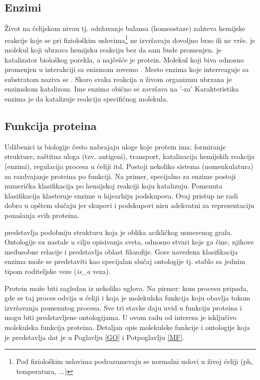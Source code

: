 \subsection{Enzimi}

Život na ćelijskom nivou tj. održavanje balansa (homeostaze) zahteva hemijske
reakcije koje se pri fiziološkim uslovima\footnote{Pod fiziološkim uslovima
podrazumevaju se normalni uslovi u živoj ćeliji (ph, temperatura, ...)} ne
izvršavaju dovoljno brzo ili ne vrše.
 je molekul koji ubrzava hemijsku reakciju bez da sam bude
promenjen.  je katalizator biološkog porekla, a najčešće je protein.
Molekul koji biva  odnosno promenjen u interakciji sa
enizmom zovemo . Mesto enzima koje interreaguje sa
substratom naziva se .  Skoro svaka reakcija u živom
organizmu ubrzana je enzimskom katalizom. Ime enzima obično se završava na '-za'
Karakteristika enzima je da katalizuje reakciju specifičnog molekula.

\subsection{Funkcija proteina}

Udžbenici iz biologije često nabrajaju uloge koje protein ima: formiranje
strukture, zaštitna uloga (tzv. antigeni), transport, katalizacija hemijskih
reakcija (enzimi), regulacija procesa u ćeliji itd.  Postoji nekoliko sistema
(nomenkulatura) za razdvajanje proteina po funkciji.  Na primer, specijalno za
enzime postoji numerička klasifikacija po hemijskoj reakciji koju katalizuju.
Pomenuta klasifikacija klasteruje enzime u hijearhiju podskupova. Ovaj pristup
ne radi dobro u opštem slučaju jer skupovi i podskupovi nisu adekvatni za
reprezentaciju ponašanja svih proteina.

 predstavlja podobniju strukturu koja je oblika acikličkog
usmerenog grafa.  Ontologije su nastale u cilju opisivanja sveta, odnosno
stvari koje ga čine, njihove međusobne relacije i predstavlja oblast
filozofije.  Gore navedena klasifikacija enzima može se predstaviti kao
specijalan slučaj ontologije tj. stablo sa jednim tipom roditeljske veze
(\textit{is\_a} veza).

Protein može biti sagledan iz nekoliko uglova. Na pirmer: kom procesu pripada,
gde se taj proces odvija u ćeliji i koja je molekulska funkcija koju obavlja
tokom izvršavanja pomenutog procesa. Sve tri stavke daju uvid u funkciju
proteina i mogu biti predstavljene ontologijama. U ovom radu od interesa je
isključivo molekulska funkcija proteina.  Detaljan opis  molekulske funkcije i
ontologije koja je predstavlja dat je u Poglavlju \ref{GO} i Potpoglavlju
\ref{MF}.




